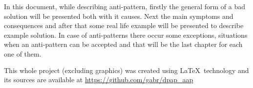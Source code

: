In this document, while describing anti-pattern, firstly the general form of a bad solution will be presented both with it causes. Next the main symptoms and consequences and after that some real life example will be presented to describe example solution.
In case of anti-patterns there occur some exceptions, situations when an anti-pattern can be accepted and that will be the last chapter for each one of them.

\begin{bottompar}
This whole project (excluding graphics) was created using \LaTeX \ technology and its sources are available at \url{https://github.com/gabr/dpap_aap}

\ 
\end{bottompar}